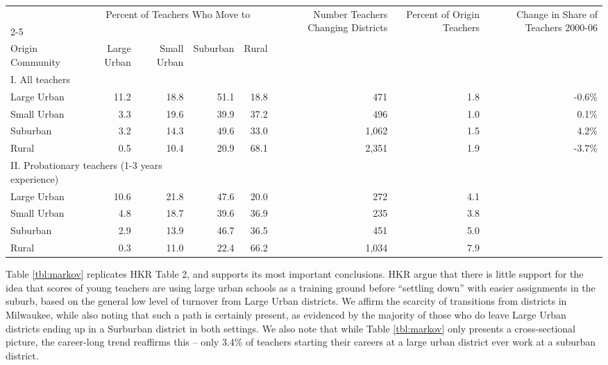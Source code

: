\documentclass[]{article}
\begin{document}
\begin{sidewaystable}[htbp]
\centering
\begin{tabular}{lrrrrrrr}
  \hline
 & \multicolumn{4}{c}{\multirow{2}{*}{Percent of Teachers Who Move to}} & \multirow{4}{*}{\parbox{0.09\linewidth}{Number Teachers Changing Districts}} & \multirow{4}{*}{\parbox{0.07\linewidth}{Percent of Origin Teachers}} & \multirow{4}{*}{\parbox{0.07\linewidth}{Change in Share of Teachers 2000-06}}\\
 & \multicolumn{4}{c}{} & & & \\ \cline{2-5}
& & & & & & & \\
Origin Community & Large Urban & Small Urban & Suburban & Rural &  &  &  \\ 
  \hline
I. All teachers & & & & & & & \\
\quad Large Urban & 11.2 & 18.8 & 51.1 & 18.8 & 471 & 1.8 & -0.6\% \\ 
  \quad Small Urban & 3.3 & 19.6 & 39.9 & 37.2 & 496 & 1.0 & 0.1\% \\ 
  \quad Suburban & 3.2 & 14.3 & 49.6 & 33.0 & 1,062 & 1.5 & 4.2\% \\ 
  \quad Rural & 0.5 & 10.4 & 20.9 & 68.1 & 2,351 & 1.9 & -3.7\% \\ 
\multicolumn{3}{l}{II. Probationary teachers (1-3 years experience)} & & & & & \\
  \quad Large Urban & 10.6 & 21.8 & 47.6 & 20.0 & 272 & 4.1 &  \\ 
  \quad Small Urban & 4.8 & 18.7 & 39.6 & 36.9 & 235 & 3.8 &  \\ 
  \quad Suburban & 2.9 & 13.9 & 46.7 & 36.5 & 451 & 5.0 &  \\ 
  \quad Rural & 0.3 & 11.0 & 22.4 & 66.2 & 1,034 & 7.9 &  \\ 
   \hline
\end{tabular}
\caption{Destination Community Type for Teachers Changing Districts, by Origin Community Type and Teacher Experience Level} 
\label{tbl:markov}
\end{sidewaystable}

Table \ref{tbl:markov} replicates HKR Table 2, and supports its most
important conclusions. HKR argue that there is little support for the
idea that scores of young teachers are using large urban schools as a
training ground before ``settling down'' with easier assignments in the
suburb, based on the general low level of turnover from Large Urban
districts. We affirm the scarcity of transitions from districts in
Milwaukee, while also noting that such a path is certainly present, as
evidenced by the majority of those who do leave Large Urban districts
ending up in a Surburban district in both settings. We also note that
while Table \ref{tbl:markov} only presents a cross-sectional picture,
the career-long trend reaffirms this -- only 3.4\% of teachers starting
their careers at a large urban district ever work at a suburban
district.
\end{document}
